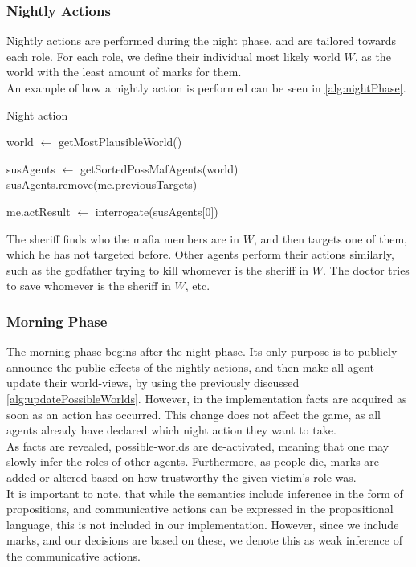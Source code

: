 \subsubsection{Nightly
	Actions}\label{sec:nightPhaseNightlyActions}
Nightly actions are performed during the night phase, and are tailored towards
each role. For each role, we define their individual most likely world $W$, as
the world with the least amount of marks for them. \\ An example of how a
nightly action is performed can be seen in \cref{alg:nightPhase}.
\begin{algorithm}[H]
	\caption{Night action}
	\begin{algorithmic}[1]
		\State world $\gets$ getMostPlausibleWorld()

		\State susAgents $\gets$ getSortedPossMafAgents(world)
		\State susAgents.remove(me.previousTargets)

		\State me.actResult $\gets$ interrogate(susAgents[0])
		\EndIf
		\EndFunction

		\Statex
	\end{algorithmic}\label{alg:nightPhase}
\end{algorithm}
\setcounter{algorithmcaption}{7}
The sheriff finds who the mafia members are in $W$, and then targets one of
them, which he has not targeted before. Other agents perform their actions
similarly, such as the godfather trying to kill whomever is the sheriff in $W$.
The doctor tries to save whomever is the sheriff in $W$, etc.

\subsubsection{Morning Phase}\label{sec:morningPhase}
The morning phase begins after the night phase. Its only purpose is to publicly
announce the public effects of the nightly actions, and then make all agent
update their world-views, by using the previously discussed
\cref{alg:updatePossibleWorlds}. However, in the implementation facts are
acquired as soon as an action has occurred. This change does not affect the
game, as all agents already have declared which night action they want to
take.\\ As facts are revealed, possible-worlds are de-activated, meaning that
one may slowly infer the roles of other agents. Furthermore, as people die,
marks are added or altered based on how trustworthy the given victim's role
was. \\ It is important to note, that while the semantics include inference in
the form of propositions, and communicative actions can be expressed in the
propositional language, this is not included in our implementation. However,
since we include marks, and our decisions are based on these, we denote this as
weak inference of the communicative actions.

